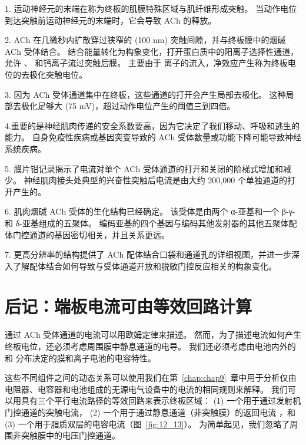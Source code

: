 1. 运动神经元的末端在称为终板的肌膜特殊区域与肌纤维形成突触。
当动作电位到达突触前运动神经元的末端时，它会导致 ACh 的释放。 


2. ACh 在几微秒内扩散穿过狭窄的 (100 nm) 突触间隙，并与终板膜中的烟碱 ACh 受体结合。
结合能量转化为构象变化，打开蛋白质中的阳离子选择性通道，允许 、 和钙离子流过突触后膜。
主要由于  离子的流入，净效应产生称为终板电位的去极化突触电位。 


3. 因为 ACh 受体通道集中在终板，这些通道的打开会产生局部去极化。
这种局部去极化足够大 (75 mV)，超过动作电位产生的阈值三到四倍。 


4.重要的是神经肌肉传递的安全系数要高，因为它决定了我们移动、呼吸和逃生的能力。
自身免疫性疾病或基因突变导致的 ACh 受体数量或功能下降可能导致神经系统疾病。 


5. 膜片钳记录揭示了电流对单个 ACh 受体通道的打开和关闭的阶梯式增加和减少。
神经肌肉接头处典型的兴奋性突触后电流是由大约 200,000 个单独通道的打开产生的。 


6. 肌肉烟碱 ACh 受体的生化结构已经确定。
该受体是由两个 α-亚基和一个 β-γ-和 δ-亚基组成的五聚体。
编码亚基的四个基因与编码其他发射器的其他五聚体配体门控通道的基因密切相关，并且关系更远。 


7. 更高分辨率的结构提供了 ACh 配体结合口袋和通道孔的详细视图，并进一步深入了解配体结合如何导致与受体通道开放和脱敏门控反应相关的构象变化。


\section{后记：端板电流可由等效回路计算}

通过 ACh 受体通道的电流可以用欧姆定律来描述。
然而，为了描述电流如何产生终板电位，还必须考虑周围膜中静息通道的电导。
我们还必须考虑由电池内外的  和  分布决定的膜和离子电池的电容特性。


这些不同组件之间的动态关系可以使用我们在第~\ref{chap:chap9}~章中用于分析仅由电阻器、电容器和电池组成的无源电气设备中的电流的相同规则来解释。
我们可以用具有三个平行电流路径的等效回路来表示终板区域：
(1) 一个用于通过发射机门控通道的突触电流，
(2) 一个用于通过静息通道（非突触膜）的返回电流 ，和 
(3) 一个用于脂质双层的电容电流（图~\ref{fig:12_13}）。 
为简单起见，我们忽略了周围非突触膜中的电压门控通道。


